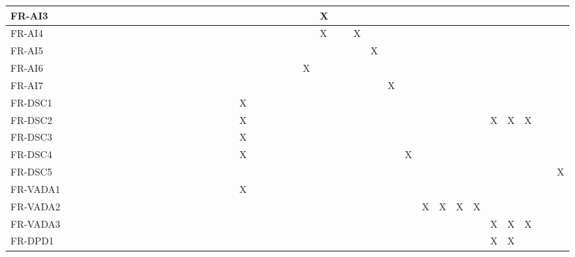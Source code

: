 \documentclass[12pt]{article}
\begin{document}
\begin{table}[H]
{\begin{tabular}{|l|l|l|l|l|l|l|l|l|l|l|l|l|l|l|l|l|l|l|l|l|l|l|l|l|l|l|l|l|l|l|l|}
      FR-AI3 & ~ & ~ & ~ & ~ & ~ & ~ & ~ & ~ & ~ & ~ & ~ & ~ & ~ & ~ & ~ & ~ & X & ~ & ~ & ~ & ~ & ~ & ~ & ~ & ~ & ~ & ~ & ~ & ~ & ~ & ~ \\ \hline
      FR-AI4 & ~ & ~ & ~ & ~ & ~ & ~ & ~ & ~ & ~ & ~ & ~ & ~ & ~ & ~ & ~ & ~ & X & ~ & X & ~ & ~ & ~ & ~ & ~ & ~ & ~ & ~ & ~ & ~ & ~ & ~ \\ \hline
      FR-AI5 & ~ & ~ & ~ & ~ & ~ & ~ & ~ & ~ & ~ & ~ & ~ & ~ & ~ & ~ & ~ & ~ & ~ & ~ & ~ & X & ~ & ~ & ~ & ~ & ~ & ~ & ~ & ~ & ~ & ~ & ~ \\ \hline
      FR-AI6 & ~ & ~ & ~ & ~ & ~ & ~ & ~ & ~ & ~ & ~ & ~ & ~ & ~ & ~ & ~ & X & ~ & ~ & ~ & ~ & ~ & ~ & ~ & ~ & ~ & ~ & ~ & ~ & ~ & ~ & ~ \\ \hline
      FR-AI7 & ~ & ~ & ~ & ~ & ~ & ~ & ~ & ~ & ~ & ~ & ~ & ~ & ~ & ~ & ~ & ~ & ~ & ~ & ~ & ~ & X & ~ & ~ & ~ & ~ & ~ & ~ & ~ & ~ & ~ & ~ \\ \hline
      FR-DSC1 & ~ & ~ & ~ & ~ & ~ & ~ & ~ & ~ & ~ & ~ & ~ & X & ~ & ~ & ~ & ~ & ~ & ~ & ~ & ~ & ~ & ~ & ~ & ~ & ~ & ~ & ~ & ~ & ~ & ~ & ~ \\ \hline
      FR-DSC2 & ~ & ~ & ~ & ~ & ~ & ~ & ~ & ~ & ~ & ~ & ~ & X & ~ & ~ & ~ & ~ & ~ & ~ & ~ & ~ & ~ & ~ & ~ & ~ & ~ & ~ & X & X & X & ~ & ~ \\ \hline
      FR-DSC3 & ~ & ~ & ~ & ~ & ~ & ~ & ~ & ~ & ~ & ~ & ~ & X & ~ & ~ & ~ & ~ & ~ & ~ & ~ & ~ & ~ & ~ & ~ & ~ & ~ & ~ & ~ & ~ & ~ & ~ & ~ \\ \hline
      FR-DSC4 & ~ & ~ & ~ & ~ & ~ & ~ & ~ & ~ & ~ & ~ & ~ & X & ~ & ~ & ~ & ~ & ~ & ~ & ~ & ~ & ~ & X & ~ & ~ & ~ & ~ & ~ & ~ & ~ & ~ & ~ \\ \hline
      FR-DSC5 & ~ & ~ & ~ & ~ & ~ & ~ & ~ & ~ & ~ & ~ & ~ & ~ & ~ & ~ & ~ & ~ & ~ & ~ & ~ & ~ & ~ & ~ & ~ & ~ & ~ & ~ & ~ & ~ & ~ & ~ & X \\ \hline
      FR-VADA1 & ~ & ~ & ~ & ~ & ~ & ~ & ~ & ~ & ~ & ~ & ~ & X & ~ & ~ & ~ & ~ & ~ & ~ & ~ & ~ & ~ & ~ & ~ & ~ & ~ & ~ & ~ & ~ & ~ & ~ & ~ \\ \hline
      FR-VADA2 & ~ & ~ & ~ & ~ & ~ & ~ & ~ & ~ & ~ & ~ & ~ & ~ & ~ & ~ & ~ & ~ & ~ & ~ & ~ & ~ & ~ & ~ & X & X & X & X & ~ & ~ & ~ & ~ & ~ \\ \hline
      FR-VADA3 & ~ & ~ & ~ & ~ & ~ & ~ & ~ & ~ & ~ & ~ & ~ & ~ & ~ & ~ & ~ & ~ & ~ & ~ & ~ & ~ & ~ & ~ & ~ & ~ & ~ & ~ & X & X & X & ~ & ~ \\ \hline
      FR-DPD1 & ~ & ~ & ~ & ~ & ~ & ~ & ~ & ~ & ~ & ~ & ~ & ~ & ~ & ~ & ~ & ~ & ~ & ~ & ~ & ~ & ~ & ~ & ~ & ~ & ~ & ~ & X & X & ~ & ~ & ~ \\ \hline

\end{tabular}}
\end{table}
\end{document}
